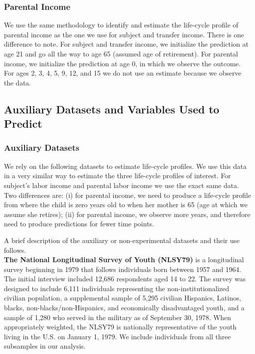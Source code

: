\subsubsection{Parental Income}

\noindent We use the same methodology to identify and estimate the life-cycle profile of parental income as the one we use for subject and transfer income. There is one difference to note. For subject and transfer income, we initialize the prediction at age 21 and go all the way to age 65 (assumed age of retirement). For parental income, we initialize the prediction at age 0, in which we observe the outcome. For ages 2, 3, 4, 5, 9, 12, and 15 we do not use an estimate because we observe the data.

\subsection{Auxiliary Datasets and Variables Used to Predict}

\subsubsection{Auxiliary Datasets}

\noindent We rely on the following datasets to estimate life-cycle profiles. We use this data in a very similar way to estimate the three life-cycle profiles of interest. For subject's labor income and parental labor income we use the exact same data. Two differences are: (i) for parental income, we need to produce a life-cycle profile from where the child is zero years old to when her mother is 65 (age at which we assume she retires); (ii) for parental income, we observe more years, and therefore need to produce predictions for fewer time points.

\noindent A brief description of the auxiliary or non-experimental datasets and their use follows.\\

\noindent \textbf{The National Longitudinal Survey of Youth (NLSY79)} is a longitudinal survey beginning in 1979 that follows individuals born between 1957 and 1964. The initial interview included 12,686 respondents aged 14 to 22. The survey was designed to include 6,111 individuals representing the non-institutionalized civilian population, a supplemental sample of 5,295 civilian Hispanics, Latinos, blacks, non-blacks/non-Hispanics, and economically disadvantaged youth, and a sample of 1,280 who served in the military as of September 30, 1978. When appropriately weighted, the NLSY79 is nationally representative of the youth living in the U.S. on January 1, 1979. We include individuals from all three subsamples in our analysis. \\

